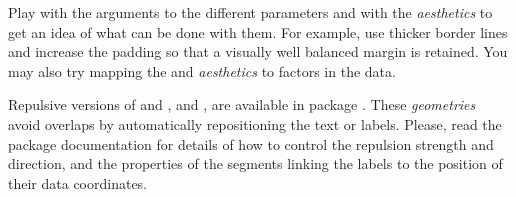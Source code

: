 \documentclass[krantz2]{krantz}\usepackage{knitr}%
\begin{document}
\begin{knitrout}\footnotesize
{}\color{fgcolor}\begin{kframe}
\begin{alltt}
    \hlopt{+}
  \hlstd{(} \hlstd{=} \hlopt{-}\hlstd{,}  \hlstd{=} \hlstd{,}  \hlstd{=} \hlstd{,}
              \hlstd{=} \hlstd{,}
              \hlstd{=} \hlstd{(}\hlstd{,} \hlstd{),}
              \hlstd{=} \hlstd{(}\hlstd{,} \hlstd{),}
              \hlstd{=} \hlstd{,}  \hlstd{=} \hlstd{)} \hlopt{+}
  \hlstd{()}
\end{alltt}
\end{kframe}
\end{knitrout}

\begin{playground}
Play with the arguments to the different parameters and with the \emph{aesthetics} to get an idea of what can be done with them. For example, use thicker border lines and increase the padding so that a visually well balanced margin is retained. You may also try mapping the  and  \emph{aesthetics} to factors in the data.
\end{playground}

Repulsive versions of  and ,  and ,  are available in package . These \emph{geometries} avoid overlaps by automatically repositioning the text or labels. Please, read the package documentation for details of how to control the repulsion strength and direction, and the properties of the segments linking the labels to the position of their data coordinates.
\end{document}
